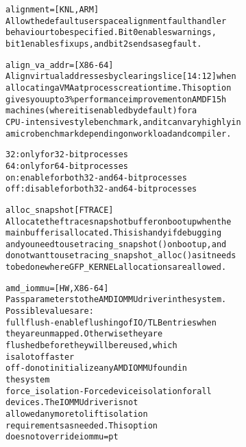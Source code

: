 \documentclass[a4paper,8pt,english]{sphinxmanual}
\begin{document}
\begin{alltt}
        alignment=      {[}KNL,ARM{]}
                        Allow the default userspace alignment fault handler
                        behaviour to be specified.  Bit 0 enables warnings,
                        bit 1 enables fixups, and bit 2 sends a segfault.

        align\_va\_addr=  {[}X86-64{]}
                        Align virtual addresses by clearing slice {[}14:12{]} when
                        allocating a VMA at process creation time. This option
                        gives you up to 3\% performance improvement on AMD F15h
                        machines (where it is enabled by default) for a
                        CPU-intensive style benchmark, and it can vary highly in
                        a microbenchmark depending on workload and compiler.

                        32: only for 32-bit processes
                        64: only for 64-bit processes
                        on: enable for both 32- and 64-bit processes
                        off: disable for both 32- and 64-bit processes

        alloc\_snapshot  {[}FTRACE{]}
                        Allocate the ftrace snapshot buffer on boot up when the
                        main buffer is allocated. This is handy if debugging
                        and you need to use tracing\_snapshot() on boot up, and
                        do not want to use tracing\_snapshot\_alloc() as it needs
                        to be done where GFP\_KERNEL allocations are allowed.

        amd\_iommu=      {[}HW,X86-64{]}
                        Pass parameters to the AMD IOMMU driver in the system.
                        Possible values are:
                        fullflush - enable flushing of IO/TLB entries when
                                    they are unmapped. Otherwise they are
                                    flushed before they will be reused, which
                                    is a lot of faster
                        off       - do not initialize any AMD IOMMU found in
                                    the system
                        force\_isolation - Force device isolation for all
                                          devices. The IOMMU driver is not
                                          allowed anymore to lift isolation
                                          requirements as needed. This option
                                          does not override iommu=pt


\end{alltt}
\end{document}
